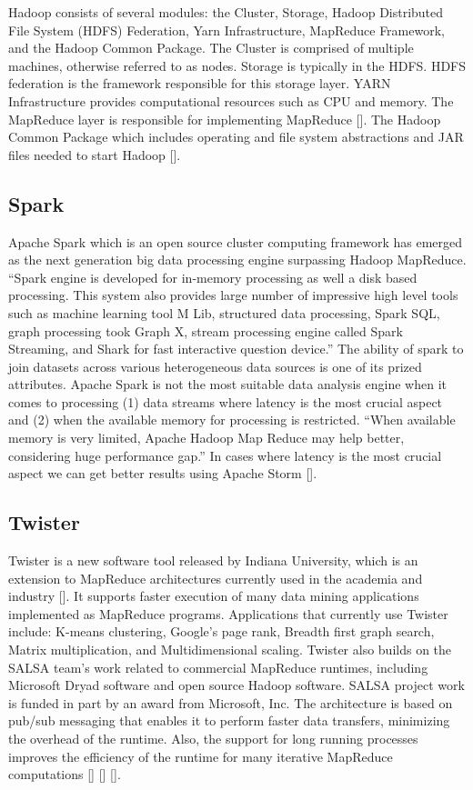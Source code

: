 Hadoop consists of several modules: the Cluster, Storage, Hadoop
Distributed File System (HDFS) Federation, Yarn Infrastructure,
MapReduce Framework, and the Hadoop Common Package.  The Cluster is
comprised of multiple machines, otherwise referred to as nodes.
Storage is typically in the HDFS.  HDFS federation is the framework
responsible for this storage layer.  YARN Infrastructure provides
computational resources such as CPU and memory. The MapReduce layer is
responsible for implementing MapReduce [\cite{www-hadooparch2}].  The
Hadoop Common Package which includes operating and file system
abstractions and JAR files needed to start Hadoop
 [\cite{www-wikihadoop}].


\subsection{Spark}

Apache Spark which is an open source cluster computing framework has
emerged as the next generation big data processing engine surpassing
Hadoop MapReduce. ``Spark engine is developed for in-memory processing
as well a disk based processing. This system also provides large
number of impressive high level tools such as machine learning tool M
Lib, structured data processing, Spark SQL, graph processing took
Graph X, stream processing engine called Spark Streaming, and Shark
for fast interactive question device.'' The ability of spark to join
datasets across various heterogeneous data sources is one of its
prized attributes. Apache Spark is not the most suitable data analysis
engine when it comes to processing (1) data streams where latency is
the most crucial aspect and (2) when the available memory for
processing is restricted. ``When available memory is very limited,
Apache Hadoop Map Reduce may help better, considering huge performance
gap.'' In cases where latency is the most crucial aspect we can get
better results using Apache Storm [\cite{www-spark}].
     
\subsection{Twister}

Twister is a new software tool released by Indiana University, which
is an extension to MapReduce architectures currently used in the
academia and industry [\cite{www-twister1}]. It supports faster
execution of many data mining applications implemented as MapReduce
programs. Applications that currently use Twister include: K-means
clustering, Google's page rank, Breadth first graph search, Matrix
multiplication, and Multidimensional scaling. Twister also builds on
the SALSA team's work related to commercial MapReduce runtimes,
including Microsoft Dryad software and open source Hadoop
software. SALSA project work is funded in part by an award from
Microsoft, Inc. The architecture is based on pub/sub messaging that
enables it to perform faster data transfers, minimizing the overhead
of the runtime. Also, the support for long running processes improves
the efficiency of the runtime for many iterative MapReduce
computations [\cite{www-twister2}] [\cite{www-twister3}] [\cite{paper-twister}].

